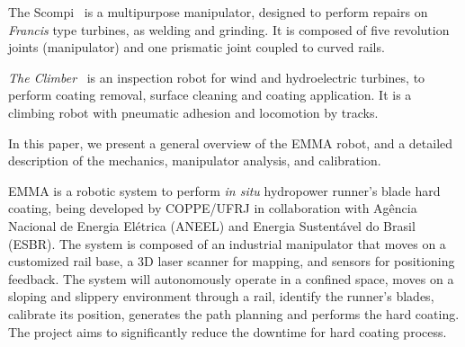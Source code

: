 The Scompi~\cite{scompi} is a multipurpose manipulator, designed to
perform repairs on \textit{Francis} type turbines, as welding and grinding. It
is composed of five revolution joints (manipulator) and one prismatic joint
coupled to curved rails.

\textit{The Climber}~\cite{icm} is an inspection robot for wind and
hydroelectric turbines, to perform coating removal, surface cleaning and
coating application. It is a climbing robot with pneumatic adhesion and
locomotion by tracks.

In this paper, we present a general overview of the EMMA robot, and a detailed
description of the mechanics, manipulator analysis, and calibration.

EMMA is a robotic system to perform \textit{in situ} hydropower runner's
blade hard coating, being developed by COPPE/UFRJ in collaboration with Agência
Nacional de Energia Elétrica (ANEEL) and Energia Sustentável do Brasil (ESBR). The system
is composed of an industrial manipulator that moves on a customized rail base, a
3D laser scanner for mapping, and sensors for positioning feedback. The
system will autonomously operate in a confined space, moves on a sloping
and slippery environment through a rail, identify the runner's blades, calibrate
its position, generates the path planning and performs the hard coating. The
project aims to significantly reduce the downtime for hard coating process.


\begin{comment}
require stoppage of the turbine, removing the
blades, positioning the blades for coating, coating application, turbine assembling, and recalibration. The downtime to perform all
maintenance can take up to two months, meaning a huge loss in power generation.
\end{comment}





